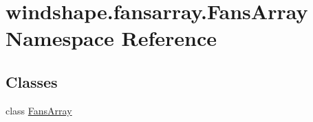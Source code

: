 \hypertarget{namespacewindshape_1_1fansarray_1_1_fans_array}{}\section{windshape.\+fansarray.\+Fans\+Array Namespace Reference}
\label{namespacewindshape_1_1fansarray_1_1_fans_array}
\subsection*{Classes}
\begin{DoxyCompactItemize}
\item 
class \mbox{\hyperlink{classwindshape_1_1fansarray_1_1_fans_array_1_1_fans_array}{Fans\+Array}}
\end{DoxyCompactItemize}
